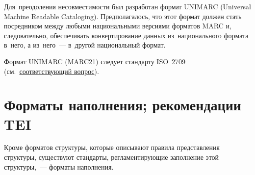 \documentclass[12pt]{article}
\theoremstyle{definition}
\theoremstyle{remark}
\numberwithin{equation}{section}
\begin{document}
Для~преодоления несовместимости был разработан формат UNIMARC
(Universal Machine Readable Cataloging). Предполагалось, что этот
формат должен стать посредником между любыми национальными версиями
форматов MARC и, следовательно, обеспечивать конвертирование данных
из~национального формата в~него, а из~него~--- в~другой национальный
формат.

Формат UNIMARC (MARC21) следует стандарту ISO~2709
(см.~\hyperref[subsec:ISO]{соответствующий вопрос}).

\section{Форматы наполнения; рекомендации TEI}
\label{sec:TEI}
Кроме форматов структуры, которые описывают правила представления
структуры, существуют стандарты, регламентирующие заполнение этой
структуры,~--- форматы наполнения.
\end{document}
